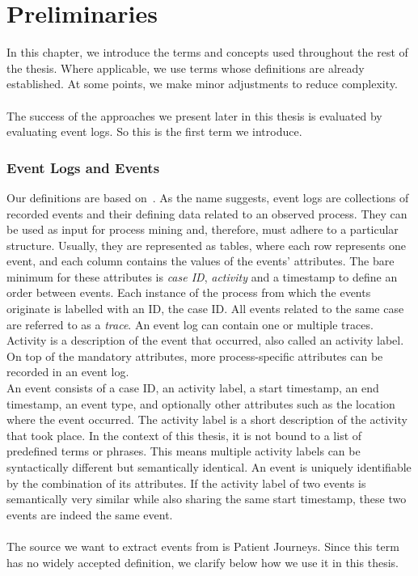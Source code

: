
\section{Preliminaries}\label{sec:back}
In this chapter, we introduce the terms and concepts used throughout the rest of the thesis. Where applicable, we use terms whose definitions are already established. At some points, we make minor adjustments to reduce complexity.\\\\ 
The success of the approaches we present later in this thesis is evaluated by evaluating event logs. So this is the first term we introduce.
\subsubsection*{Event Logs and Events}\label{sec:event-log}
Our definitions are based on~\cite{van_der_aalst_process_2016}.
As the name suggests, event logs are collections of recorded events and their defining data related to an observed process. They can be used as input for process mining and, therefore, must adhere to a particular structure. Usually, they are represented as tables, where each row represents one event, and each column contains the values of the events' attributes. The bare minimum for these attributes is \emph{case ID}, \emph{activity} and a timestamp to define an order between events. Each instance of the process from which the events originate is labelled with an ID, the case ID. All events related to the same case are referred to as a \emph{trace}. An event log can contain one or multiple traces. Activity is a description of the event that occurred, also called an activity label. On top of the mandatory attributes, more process-specific attributes can be recorded in an event log.\\
An event consists of a case ID, an activity label, a start timestamp, an end timestamp, an event type, and optionally other attributes such as the location where the event occurred. The activity label is a short description of the activity that took place. In the context of this thesis, it is not bound to a list of predefined terms or phrases. This means multiple activity labels can be syntactically different but semantically identical. An event is uniquely identifiable by the combination of its attributes. If the activity label of two events is semantically very similar while also sharing the same start timestamp, these two events are indeed the same event.\\\\
The source we want to extract events from is Patient Journeys. Since this term has no widely accepted definition, we clarify below how we use it in this thesis.


